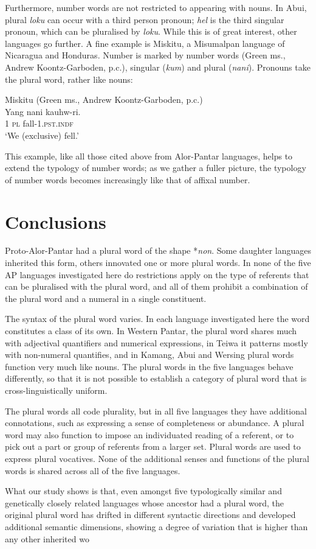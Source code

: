  Furthermore, number words are not restricted to appearing with nouns. In Abui, plural \textit{loku} can occur with a third person pronoun; \textit{hel} is the third singular pronoun, which can be pluralised by \textit{loku}. While this is of great interest, other languages go further. A fine example is Miskitu, a Misumalpan language of Nicaragua and Honduras. Number is marked by number words (Green ms., Andrew Koontz-Garboden, p.c.), singular (\textit{kum}) and plural (\textit{nani}). Pronouns take the plural word, rather like nouns:


\ea%
\label{ex:113}
Miskitu (Green ms., Andrew Koontz-Garboden, p.c.)\\
\gll   Yang nani {kauhw-ri.}\\
  1 \textsc{pl} fall-1.\textsc{pst.indf}  \\
\glt `We (exclusive) fell.'
\z






This example, like all those cited above from Alor-Pantar languages, helps to extend the typology of number words; as we gather a fuller picture, the typology of number words becomes increasingly like that of affixal number.


\section{Conclusions} %
Proto-Alor-Pantar had a plural word of the shape *\textit{non}. Some daughter languages inherited this form, others innovated one or more plural words. In none of the five AP languages investigated here do restrictions apply on the type of referents that can be pluralised with the plural word, and all of them prohibit a combination of the plural word and a numeral in a single constituent.

 The syntax of the plural word varies. In each language investigated here the word constitutes a class of its own. In Western Pantar, the plural word shares much with adjectival quantifiers and numerical expressions, in Teiwa it patterns mostly with non-numeral quantifies, and in Kamang, Abui and Wersing plural words function very much like nouns. The plural words in the five languages behave differently, so that it is not possible to establish a category of plural word that is cross-linguistically uniform.

 The plural words all code plurality, but in all five languages they have additional connotations, such as expressing a sense of completeness or abundance. A plural word may also function to impose an individuated reading of a referent, or to pick out a part or group of referents from a larger set. Plural words are used to express plural vocatives. None of the additional senses and functions of the plural words is shared across all of the five languages.

 What our study shows is that, even amongst five typologically similar and genetically closely related languages whose ancestor had a plural word, the original plural word has drifted in different syntactic directions and developed additional semantic dimensions, showing a degree of variation that is higher than any other inherited wo

